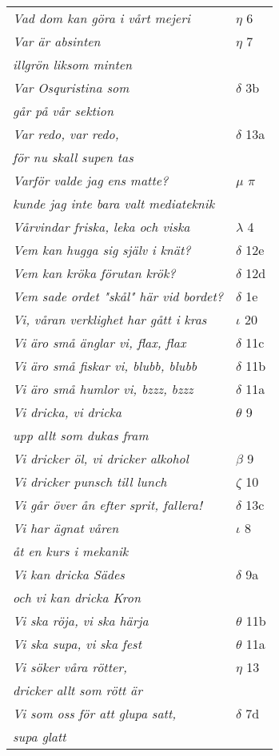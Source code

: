 \documentclass[a6paper,10pt]{article}
\begin{document}
\newpage
\setlength{\oddsidemargin}{-0.47in}
\begin{table}[!h]
\begin{tabular}{l l}
\textit{Vad dom kan göra i vårt mejeri}	&$\eta$ 6\\
\textit{Var är absinten}	&$\eta$ 7\\
\textit{illgrön liksom minten} &\\
\textit{Var Osquristina som}	&$\delta$ 3b\\
\textit{går på vår sektion} &\\
\textit{Var redo, var redo,}	&$\delta$ 13a\\
\textit{för nu skall supen tas} &\\
\textit{Varför valde jag ens matte?} &$\mu$ $\pi$\\
\textit{kunde jag inte bara valt mediateknik} &\\
\textit{Vårvindar friska, leka och viska}	&$\lambda$ 4\\
\textit{Vem kan hugga sig själv i knät?}	&$\delta$ 12e\\
\textit{Vem kan kröka förutan krök?}	&$\delta$ 12d\\
\textit{Vem sade ordet "skål" här vid bordet?}	&$\delta$ 1e\\
\textit{Vi, våran verklighet har gått i kras}&$\iota$ 20\\
\textit{Vi äro små änglar vi, flax, flax}	&$\delta$ 11c\\
\textit{Vi äro små fiskar vi, blubb, blubb}	&$\delta$ 11b\\
\textit{Vi äro små humlor vi, bzzz, bzzz}	&$\delta$ 11a\\
\textit{Vi dricka, vi dricka}	&$\theta$ 9\\
\textit{upp allt som dukas fram} &\\
\textit{Vi dricker öl, vi dricker alkohol}	&$\beta$ 9\\
\textit{Vi dricker punsch till lunch}	&$\zeta$ 10\\
\textit{Vi går över ån efter sprit, fallera!}	&$\delta$ 13c\\
\textit{Vi har ägnat våren}	&$\iota$ 8\\
\textit{åt en kurs i mekanik} &\\
\textit{Vi kan dricka Sädes}	&$\delta$ 9a\\
\textit{och vi kan dricka Kron} &\\
\textit{Vi ska röja, vi ska härja}	&$\theta$ 11b\\
\textit{Vi ska supa, vi ska fest}	&$\theta$ 11a\\
\textit{Vi söker våra rötter,}	&$\eta$ 13\\
\textit{dricker allt som rött är} &\\
\textit{Vi som oss för att glupa satt,}	&$\delta$ 7d\\
\textit{supa glatt} &\\
\end{tabular}
\end{table}
\end{document}
